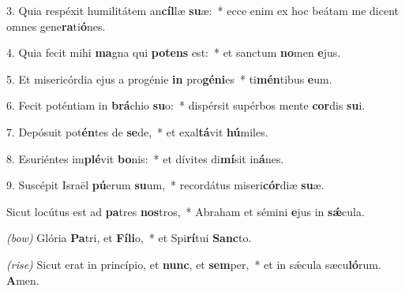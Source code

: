 3. Quia respéxit humilitátem an\textbf{cíl}læ \textbf{su}æ:~*
	ecce enim ex hoc beátam me dicent omnes gene\textbf{ra}ti\textbf{ó}nes.

4. Quia fecit mihi \textbf{ma}gna qui \textbf{pot}\textbf{ens} est:~*
	et sanctum \textbf{no}men \textbf{e}jus.

5. Et misericórdia ejus a progénie \textbf{in} pro\textbf{gé}\textbf{ni}es~*
	ti\textbf{mén}tibus \textbf{e}um.

6. Fecit poténtiam in \textbf{brá}chio \textbf{su}o:~*
	dispérsit supérbos mente \textbf{cor}dis \textbf{su}i.

7. Depósuit pot\textbf{én}tes de \textbf{se}de,~*
	et exal\textbf{tá}vit \textbf{hú}miles.

8. Esuriéntes im\textbf{plé}vit \textbf{bo}nis:~*
	et dívites di\textbf{mí}sit in\textbf{á}nes.

9. Suscépit Israël \textbf{pú}erum \textbf{su}um,~*
	recordátus miseri\textbf{cór}diæ \textbf{su}æ.

Sicut locútus est ad \textbf{pa}tres \textbf{nos}tros,~*
	Abraham et sémini \textbf{e}jus in \textbf{s\'{\ae}}cula.

\textit{(bow)} Glória \textbf{Pa}tri, et \textbf{Fí}\textbf{li}o,~*
	et Spi\textbf{rí}tui \textbf{Sanc}to.

\textit{(rise)} Sicut erat in princípio, et \textbf{nunc}, et \textbf{sem}per,~*
	et in s\'{\ae}cula sæcu\textbf{ló}rum. \textbf{A}men.